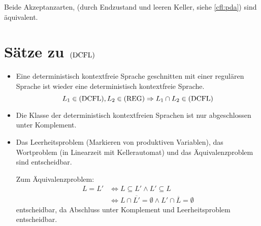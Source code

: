 Beide Akzeptanzarten, (durch Endzustand und leeren Keller, siehe \autoref{cfl:pda}) sind äquivalent.


\section{Sätze zu $\mathrm{(DCFL)}$}
\begin{itemize}
	\item Eine deterministisch kontextfreie Sprache geschnitten mit einer regulären Sprache ist wieder eine deterministisch kontextfreie Sprache.
	\begin{equation*}
		L_1\in\mathrm{(DCFL)}, L_2\in\mathrm{(REG)} \Rightarrow L_1\cap L_2\in\mathrm{(DCFL)}
	\end{equation*}
	\item Die Klasse der deterministisch kontextfreien Sprachen ist nur abgeschlossen unter Komplement.
	\item Das Leerheitsproblem (Markieren von produktiven Variablen), das Wortproblem (in Linearzeit mit Kellerautomat) und das Äquivalenzproblem sind entscheidbar.

	Zum Äquivalenzproblem:
	\begin{align*}
		L=L'&\Leftrightarrow L\subseteq L' \wedge L'\subseteq L\\
				&\Leftrightarrow L\cap \overline{L'} = \emptyset \wedge L'\cap \overline L=\emptyset
	\end{align*}
	entscheidbar, da Abschluss unter Komplement und Leerheitsproblem entscheidbar.
\end{itemize}


